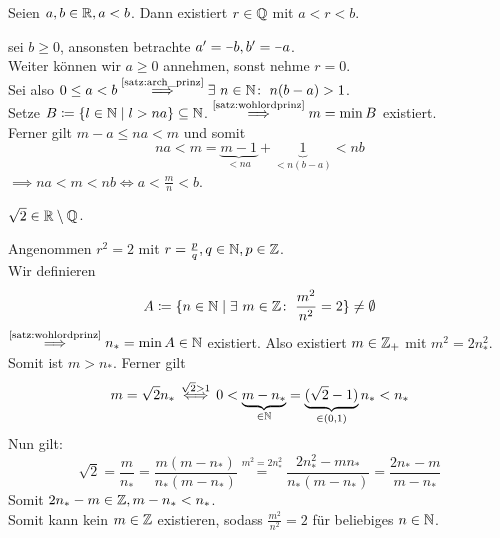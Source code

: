 \documentclass[../ana1.tex]{subfiles}
\begin{document}
\begin{satz}
	Seien \(a , b \in \mathbb{R} , a < b \). Dann existiert \( r \in \mathbb{Q} \) mit \(a < r < b \).
\end{satz}
\begin{bew}
	\Obda{} sei \(b \geq 0 \), ansonsten betrachte \( a^\prime = \minus{b} \ko b^\prime = \minus{a} \). \\
	Weiter können wir \(a \geq 0 \) annehmen, sonst nehme \(r = 0 \). \\
	Sei also \(0 \leq a < b \overset{\text{\autoref{satz:arch_prinz}}}{\implies} \exists \, n \in \N \colon \; n(b-a) > 1 \). \\
	Setze \( B \coloneqq \{ l \in \mathbb{N} \;\vert \; l > na \} \subseteq \mathbb{N} \).
	\( \overset{\text{\autoref{satz:wohlordprinz}}}{\implies} m = \min B \) existiert.\\
	Ferner gilt \(m-a \leq na < m \) und somit
	\[ na < m = \underbrace{m-1}_{< na} + \underbrace{1}_{< n(b-a)} < nb \]
	\(\implies na < m  < nb \iff a < \frac{m}{n} < b\).
\end{bew}

\iftoggle{short}{}{\newpage}%

\begin{bem}
	\(\sqrt{2} \in \mathbb{R} \setminus \mathbb{Q} \).
\end{bem}
\begin{bew}
	Angenommen \( r^2 = 2 \) mit \( r = \frac{p}{q} , q \in \mathbb{N} , p \in \mathbb{Z} \). \\
	Wir definieren 
	\[A \coloneqq \set{n \in \N \; \vert \; \exists \, m \in \Z \colon \; \frac{m^2}{n^2} = 2} \neq \emptyset \]
	\(\overset{\text{\autoref{satz:wohlordprinz}}}{\implies} n_* = \min A \in \N \) existiert. Also existiert \( m \in \mathbb{Z}_+ \) mit
	\(m^2 = 2n_*^2\). Somit ist \(m > n_* \).
	Ferner gilt
	\[ m= \sqrt{2}n_* \overset{\sqrt{2} > 1}{\iff} 0 < \underbrace{m - n_*}_{\in \mathbb{N}} = \underbrace{(\sqrt{2} - 1)}_{\in (0 , 1)} n_* < n_* \]
	Nun gilt: 
	\[ \sqrt{2} = \frac{m}{n_*} = \frac{m(m - n_*)}{n_*(m-n_*)} \overset{m^2 = 2n_*^2}{=} \frac{2n_*^2 - mn_*}{n_*(m - n_*)} = \frac{2n_* - m}{m - n_*} \]
	Somit \(2n_* - m \in \mathbb{Z} , m - n_* < n_* \).  \\
	Somit kann kein \(m \in \mathbb{Z} \) existieren, sodass \(\frac{m^2}{n^2} = 2 \) für beliebiges \(n \in \mathbb{N} \).
\end{bew}
\end{document}
